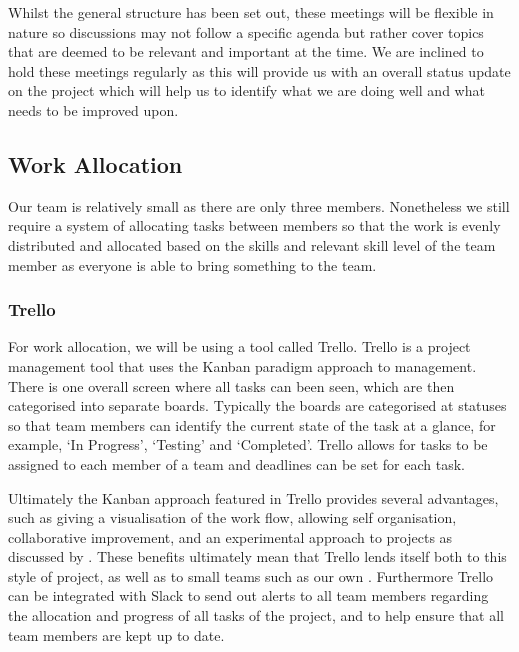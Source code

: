 \documentclass{article}
\begin{document}
Whilst the general structure has been set out, these meetings will be flexible in nature so discussions may not follow a specific agenda but rather cover topics that are deemed to be relevant and important at the time. We are inclined to hold these meetings regularly as this will provide us with an overall status update on the project which will help us to identify what we are doing well and what needs to be improved upon.

\subsection{Work Allocation}

Our team is relatively small as there are only three members. Nonetheless we still require a system of allocating tasks between members so that the work is evenly distributed and allocated based on the skills and relevant skill level of the team member as everyone is able to bring something to the team. 

\subsubsection{Trello}

For work allocation, we will be using a tool called Trello. Trello is a project management tool that uses the Kanban paradigm approach to management. There is one overall screen where all tasks can been seen, which are then categorised into separate boards. Typically the boards are categorised at statuses so that team members can identify the current state of the task at a glance, for example, `In Progress', `Testing' and `Completed'. Trello allows for tasks to be assigned to each member of a team and deadlines can be set for each task.

\par

Ultimately the Kanban approach featured in Trello provides several advantages, such as giving a visualisation of the work flow, allowing self organisation, collaborative improvement, and an experimental approach to projects as discussed by \textcite{anderson2010kanban}. These benefits ultimately mean that Trello lends itself both to this style of project, as well as to small teams such as our own \parencite{kanbanforasmallteam, whenkanbanworksbest}. Furthermore Trello can be integrated with Slack to send out alerts to all team members regarding the allocation and progress of all tasks of the project, and to help ensure that all team members are kept up to date.
\end{document}
